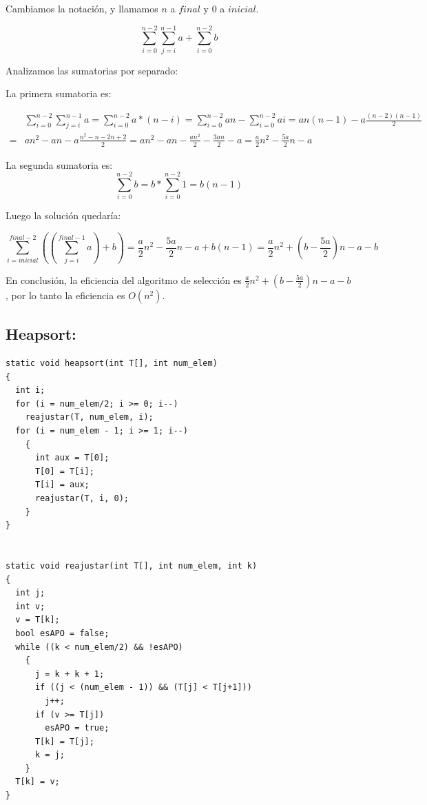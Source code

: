 \documentclass{article}
\begin{document}
Cambiamos la notación, y llamamos $n$ a $final$ y $0$ a $inicial$.

\begin{equation*}
\sum\limits_{i=0}^{n-2}\sum\limits_{j=i}^{n-1}a + \sum\limits_{i=0}^{n-2}b
\end{equation*}

Analizamos las sumatorias por separado:

La primera sumatoria es:

\begin{align*}
  &\sum\limits_{i=0}^{n-2}\sum\limits_{j=i}^{n-1}a
  =\sum\limits_{i=0}^{n-2}a*(n-i)=
  \sum\limits_{i=0}^{n-2}an - \sum\limits_{i=0}^{n-2}ai =
  an(n-1)-a\frac{(n-2)(n-1)}{2} \\
  =&an^2-an-a\frac{n^2-n-2n+2}{2}= 
  an^2-an-\frac{an^2}{2}-\frac{3an}{2}-a=
  \frac{a}{2}n^2-\frac{5a}{2}n-a
\end{align*}

La segunda sumatoria es:
\begin{equation*}
\sum\limits_{i=0}^{n-2}b=b*\sum\limits_{i=0}^{n-2}1=b(n-1)
\end{equation*}

Luego la solución quedaría:

\begin{equation*}
  \sum\limits_{i=inicial}^{final-2}\left(\left(\sum\limits_{j=i}^{final-1}a\right)+b\right) =
  \frac{a}{2}n^2-\frac{5a}{2}n-a + b(n-1) =
  \frac{a}{2}n^2+(b-\frac{5a}{2})n-a-b  
\end{equation*}

En conclusión, la eficiencia del algoritmo de selección es $\frac{a}{2}n^2+(b-\frac{5a}{2})n-a-b$, por lo tanto la eficiencia es $O(n^2)$.


\subsection{Heapsort:}

\begin{lstlisting}
static void heapsort(int T[], int num_elem)
{
  int i;
  for (i = num_elem/2; i >= 0; i--)
    reajustar(T, num_elem, i);
  for (i = num_elem - 1; i >= 1; i--)
    {
      int aux = T[0];
      T[0] = T[i];
      T[i] = aux;
      reajustar(T, i, 0);
    }
}
  

static void reajustar(int T[], int num_elem, int k)
{
  int j;
  int v;
  v = T[k];
  bool esAPO = false;
  while ((k < num_elem/2) && !esAPO)
    {
      j = k + k + 1;
      if ((j < (num_elem - 1)) && (T[j] < T[j+1]))
        j++;
      if (v >= T[j])
        esAPO = true;
      T[k] = T[j];
      k = j;
    }
  T[k] = v;
}
\end{lstlisting}
\end{document}
